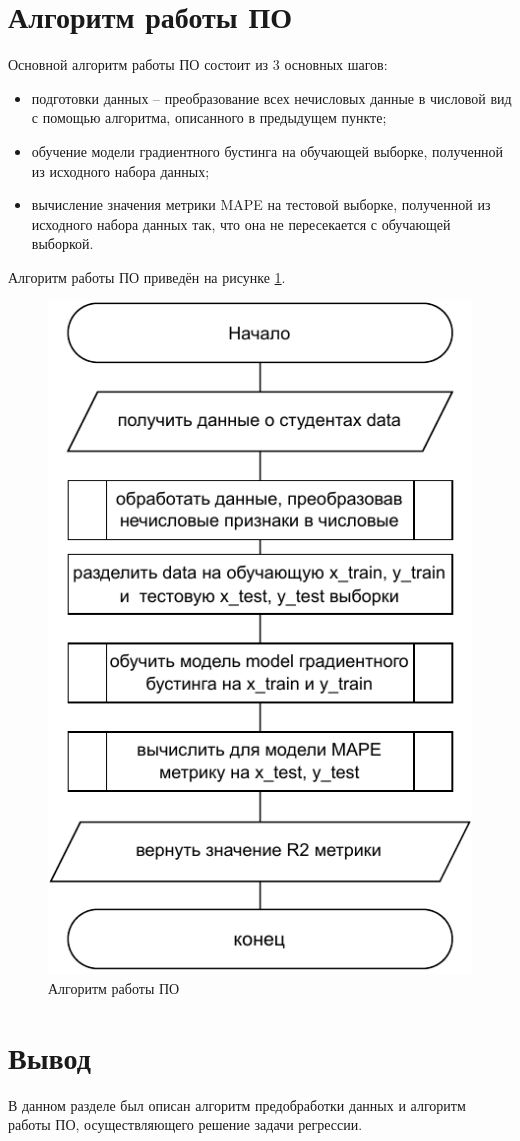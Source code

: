 \section{Алгоритм работы ПО}
Основной алгоритм работы ПО состоит из 3 основных шагов: 
\begin{itemize}
    \item подготовки данных -- преобразование всех нечисловых данные в числовой вид с помощью алгоритма, описанного в предыдущем пункте;
    \item обучение модели градиентного бустинга на обучающей выборке, полученной из исходного набора данных;
    \item вычисление значения метрики MAPE на тестовой выборке, полученной из исходного набора данных так, что она не пересекается с обучающей выборкой. 
\end{itemize}

\newpage
Алгоритм работы ПО приведён на рисунке \ref{fig:common}.
\begin{figure}[h!]
	\centering
	\includegraphics[scale = 1]{img/base.pdf}
	\caption{Алгоритм работы ПО}
	\label{fig:common}
\end{figure}




\section*{Вывод}

В данном разделе был описан алгоритм предобработки данных и алгоритм работы ПО, осуществляющего решение задачи регрессии.

